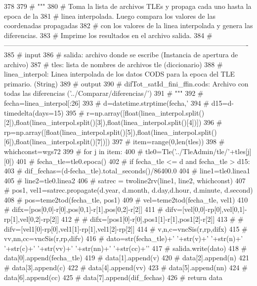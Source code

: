 \begin{DoxyCode}
378     
379 #     """
380 #     Toma la lista de archivos TLEs y propaga cada uno hasta la epoca de la
381 #     linea interpolada. Luego compara los valores de las coordenadas
       propagadas
382 #     con los valores de la linea interpolada y genera las diferencias. 
383 #     Imprime los resultados en el archivo salida.     
384 #    
       ----------------------------------------------------------------------------------------------------------
385 #     input
386 #         salida: archivo donde se escribe (Instancia de apertura de archivo)
387 #         tles: lista de nombres de archivos tle (diccionario)
388 #         linea_interpol: Linea interpolada de los datos CODS para la epoca del
       TLE primario. (String)
389 #     output
390 #         difTot_satId_fini_ffin.cods: Archivo con todas las diferencias
       ('../Comparar/diferencias/')
391 #     """
392 #     fecha=linea_interpol[:26]
393 #     d=datetime.strptime(fecha,'%
394 #     d15=d-timedelta(days=15)
395 #    
       r=np.array([float(linea_interpol.split()[2]),float(linea_interpol.split()[3]),float(linea_interpol.split()[4])])
396 #    
       rp=np.array([float(linea_interpol.split()[5]),float(linea_interpol.split()[6]),float(linea_interpol.split()[7])])
397 #     item=range(0,len(tles))
398 #     whichconst=wgs72
399 #     for j in item:
400 #         tle0=Tle('../TleAdmin/tle/'+tles[j][0])
401 #         fecha_tle=tle0.epoca()
402 #         if fecha_tle <= d and fecha_tle > d15:
403 #             dif_fechas=(d-fecha_tle).total_seconds()/86400.0
404 #             line1=tle0.linea1
405 #             line2=tle0.linea2
406 #             satrec = twoline2rv(line1, line2, whichconst)
407 #             pos1, vel1=satrec.propagate(d.year, d.month, d.day,d.hour,
       d.minute, d.second)
408 #             pos=teme2tod(fecha_tle, pos1)
409 #             vel=teme2tod(fecha_tle, vel1)
410 #             difx=[pos[0,0]-r[0],pos[0,1]-r[1],pos[0,2]-r[2]]
411 #             difv=[vel[0,0]-rp[0],vel[0,1]-rp[1],vel[0,2]-rp[2]]
412 # #             difx=[pos1[0]-r[0],pos1[1]-r[1],pos1[2]-r[2]]
413 # #             difv=[vel1[0]-rp[0],vel1[1]-rp[1],vel1[2]-rp[2]]
414 #             v,n,c=vncSis(r,rp,difx)
415 #             vv,nn,cc=vncSis(r,rp,difv)
416 #             dato=str(fecha_tle)+' '+str(v)+' '+str(n)+' '+str(c)+'
       '+str(vv)+' '+str(nn)+' '+str(cc)+'\n'
417 #             salida.write(dato)
418 #             data[0].append(fecha_tle)
419 #             data[1].append(v)
420 #             data[2].append(n)
421 #             data[3].append(c)
422 #             data[4].append(vv)
423 #             data[5].append(nn)
424 #             data[6].append(cc)
425 #             data[7].append(dif_fechas)
426 #     return data

\end{DoxyCode}


